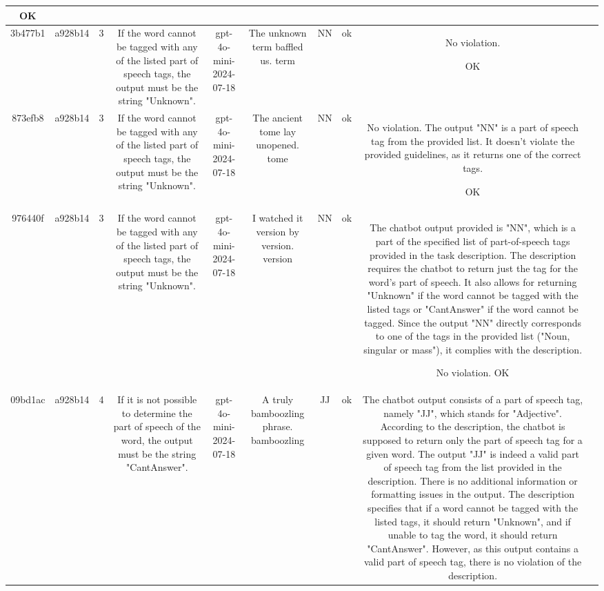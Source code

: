 \begin{table}[h!]
\begin{tabular}{|c|c|c|c|c|c|c|c|c|c|}
OK & \\
\hline
3b477b1 & a928b14 & 3 & If the word cannot be tagged with any of the listed part of speech tags, the output must be the string "Unknown". & gpt-4o-mini-2024-07-18 & The unknown term baffled us. term & NN & ok & No violation.

OK & \\
\hline
873efb8 & a928b14 & 3 & If the word cannot be tagged with any of the listed part of speech tags, the output must be the string "Unknown". & gpt-4o-mini-2024-07-18 & The ancient tome lay unopened. tome & NN & ok & No violation. The output "NN" is a part of speech tag from the provided list. It doesn't violate the provided guidelines, as it returns one of the correct tags.

OK & \\
\hline
976440f & a928b14 & 3 & If the word cannot be tagged with any of the listed part of speech tags, the output must be the string "Unknown". & gpt-4o-mini-2024-07-18 & I watched it version by version. version & NN & ok & The chatbot output provided is "NN", which is a part of the specified list of part-of-speech tags provided in the task description. The description requires the chatbot to return just the tag for the word's part of speech. It also allows for returning "Unknown" if the word cannot be tagged with the listed tags or "CantAnswer" if the word cannot be tagged. Since the output "NN" directly corresponds to one of the tags in the provided list ("Noun, singular or mass"), it complies with the description.

No violation.
OK & \\
\hline
09bd1ac & a928b14 & 4 & If it is not possible to determine the part of speech of the word, the output must be the string "CantAnswer". & gpt-4o-mini-2024-07-18 & A truly bamboozling phrase. bamboozling & JJ & ok & The chatbot output consists of a part of speech tag, namely "JJ", which stands for "Adjective". According to the description, the chatbot is supposed to return only the part of speech tag for a given word. The output "JJ" is indeed a valid part of speech tag from the list provided in the description. There is no additional information or formatting issues in the output. The description specifies that if a word cannot be tagged with the listed tags, it should return "Unknown", and if unable to tag the word, it should return "CantAnswer". However, as this output contains a valid part of speech tag, there is no violation of the description.


\end{tabular}
\end{table}
